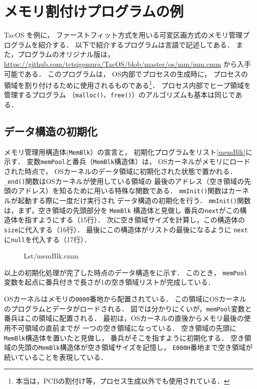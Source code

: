 \chapter{メモリ割付けプログラムの例}
\label{tacosMalloc}

TacOS を例に，
ファーストフィット方式を用いる可変区画方式のメモリ管理プログラムを紹介する．
以下で紹介するプログラムは{\cmm}言語で記述してある．
また，プログラムのオリジナル版は，
\url{https://github.com/tctsigemura/TacOS/blob/master/os/mm/mm.cmm}
から入手可能である．
このプログラムは，
OS内部でプロセスの生成時に，
プロセスの領域を割り付けるために使用されるものである\footnote{
本当は，PCBの割付け等，プロセス生成以外でも使用されている．}．
プロセス内部でヒープ領域を管理するプログラム
（{\tt malloc()}、{\tt free()}）のアルゴリズムも基本は同じである．

\section{データ構造の初期化}
メモリ管理用構造体({\tt MemBlk}）の宣言と，
初期化プログラムをリスト\ref{memBlk}に示す．
変数{\tt memPool}と番兵（{\tt MemBlk}構造体）は，
OSカーネルがメモリにロードされた時点で，
OSカーネルのデータ領域に初期化された状態で置かれる．
{\tt \_end()}関数はOSカーネルが使用している領域の
最後のアドレス（空き領域の先頭のアドレス）を知るために用いる特殊な関数である．
{\tt mmInit()}関数はカーネルが起動する際に一度だけ実行され
データ構造の初期化を行う．
{\tt mmInit()}関数は，まず，空き領域の先頭部分を {\tt MemBlk} 構造体と見做し
番兵の{\tt next}がこの構造体を指すようにする（15行）．
次に空き領域サイズを計算し，この構造体の{\tt size}に代入する（16行）．
最後にこの構造体がリストの最後になるように
{\tt next}に{\tt null}を代入する（17行）．

\begin{figure}[btph]

{Lst/memBlk.cmm}
\end{figure}

以上の初期化処理が完了した時点のデータ構造をに示す．
このとき，
{\tt memPool}変数を起点に番兵付きで長さが1の空き領域リストが完成している．

OSカーネルはメモリの{\tt 0000}番地から配置されている．
この領域にOSカーネルのプログラムとデータがロードされる．
図では分かりにくいが，{\tt memPool}変数と番兵はこの領域に配置される．
最初は，OSカーネルの直後からメモリ最後の使用不可領域の直前までが
一つの空き領域になっている．
空き領域の先頭に{\tt MemBlk}構造体を置いたと見做し，
番兵がそこを指すように初期化する．
空き領域の先頭の{\tt MemBlk}構造体が空き領域サイズを記憶し，
{\tt E000H}番地まで空き領域が続いていることを表現している．


